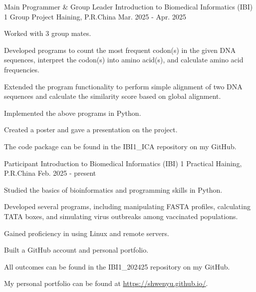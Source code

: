

\begin{cventries}

  \cventry
    {Main Programmer \& Group Leader} %
    {Introduction to Biomedical Informatics (IBI) 1 Group Project} %
    {Haining, P.R.China} %
    {Mar. 2025 - Apr. 2025} %
    {
      \begin{cvitems} %
        \item {Worked with 3 group mates.}
        \item {Developed programs to count the most frequent codon(s) in the given DNA sequences, interpret the codon(s) into amino acid(s), and calculate amino acid frequencies.}
        \item {Extended the program functionality to perform simple alignment of two DNA sequences and calculate the similarity score based on global alignment.}
        \item {Implemented the above programs in Python.}
        \item {Created a poster and gave a presentation on the project.}
        \item {The code package can be found in the IBI1\_ICA repository on my GitHub.}
      \end{cvitems}
    }

 \cventry
    {Participant} %
    {Introduction to Biomedical Informatics (IBI) 1 Practical} %
    {Haining, P.R.China} %
    {Feb. 2025 - present} %
    {
      \begin{cvitems} %
        \item {Studied the basics of bioinformatics and programming skills in Python.}
        \item {Developed several programs, including manipulating FASTA profiles, calculating TATA boxes, and simulating virus outbreaks among vaccinated populations.}
        \item {Gained proficiency in using Linux and remote servers.}
        \item {Built a GitHub account and personal portfolio.}
        \item {All outcomes can be found in the IBI1\_2024\text{-}25 repository on my GitHub.}
        \item {My personal portfolio can be found at \underline{\url{https://shwenyu.github.io/}}.}
      \end{cvitems}
      }


\end{cventries}
